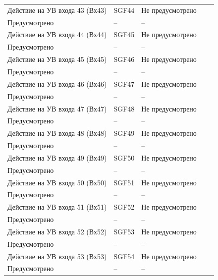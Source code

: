 \begin{longtable}{|>{\centering\arraybackslash}m{5.3cm}|>{\centering\arraybackslash}m{3.3cm}|>{\centering\arraybackslash}m{4.2cm}|>{\centering\arraybackslash}m{1.8cm}|>{\centering\arraybackslash}m{1cm}|}
\hline
\centering Действие на УВ входа 43 (Вх43)  & \centering SGF44 & \centering Не предусмотрено \\ Предусмотрено & \centering -- & \centering \arraybackslash -- \\
\hline
\centering Действие на УВ входа 44 (Вх44)  & \centering SGF45 & \centering Не предусмотрено \\ Предусмотрено & \centering -- & \centering \arraybackslash -- \\
\hline
\centering Действие на УВ входа 45 (Вх45)  & \centering SGF46 & \centering Не предусмотрено \\ Предусмотрено & \centering -- & \centering \arraybackslash -- \\
\hline
\centering Действие на УВ входа 46 (Вх46)  & \centering SGF47 & \centering Не предусмотрено \\ Предусмотрено & \centering -- & \centering \arraybackslash -- \\
\hline
\centering Действие на УВ входа 47 (Вх47)  & \centering SGF48 & \centering Не предусмотрено \\ Предусмотрено & \centering -- & \centering \arraybackslash -- \\
\hline
\centering Действие на УВ входа 48 (Вх48)  & \centering SGF49 & \centering Не предусмотрено \\ Предусмотрено & \centering -- & \centering \arraybackslash -- \\
\hline
\centering Действие на УВ входа 49 (Вх49)  & \centering SGF50 & \centering Не предусмотрено \\ Предусмотрено & \centering -- & \centering \arraybackslash -- \\
\hline
\centering Действие на УВ входа 50 (Вх50)  & \centering SGF51 & \centering Не предусмотрено \\ Предусмотрено & \centering -- & \centering \arraybackslash -- \\
\hline
\centering Действие на УВ входа 51 (Вх51)  & \centering SGF52 & \centering Не предусмотрено \\ Предусмотрено & \centering -- & \centering \arraybackslash -- \\
\hline
\centering Действие на УВ входа 52 (Вх52)  & \centering SGF53 & \centering Не предусмотрено \\ Предусмотрено & \centering -- & \centering \arraybackslash -- \\
\hline
\centering Действие на УВ входа 53 (Вх53)  & \centering SGF54 & \centering Не предусмотрено \\ Предусмотрено & \centering -- & \centering \arraybackslash -- \\

\end{longtable}
